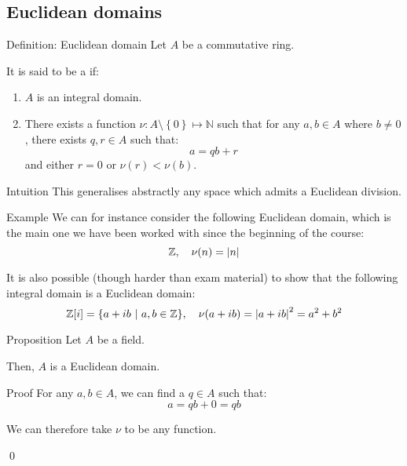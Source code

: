 \documentclass[a4paper]{article}
\begin{document}
\subsection{Euclidean domains}

\begin{parag}{Definition: Euclidean domain}
    Let $A$ be a commutative ring. 

    It is said to be a  if:
    \begin{enumerate}
        \item $A$ is an integral domain.
        \item There exists a function $\nu: A \setminus \left\{0\right\} \mapsto \mathbb{N}$ such that for any $a, b \in A$ where $b \neq 0$, there exists $q, r \in A$ such that: 
        \[a = qb + r\]
        and either $r = 0$ or $\nu\left(r\right) < \nu\left(b\right)$.
    \end{enumerate}

    \begin{subparag}{Intuition}
        This generalises abstractly any space which admits a Euclidean division.
    \end{subparag}

    \begin{subparag}{Example}
        We can for instance consider the following Euclidean domain, which is the main one we have been worked with since the beginning of the course:
        \[\mathbb{Z}, \mathspace \nu\left(n\right) = \left|n\right|\]

        It is also possible (though harder than exam material) to show that the following integral domain is a Euclidean domain: 
        \[\mathbb{Z}\left[i\right] = \left\{a + ib \suchthat a, b \in \mathbb{Z}\right\}, \mathspace \nu\left(a + ib\right) = \left|a + ib\right|^2 = a^2 + b^2\]
        
    \end{subparag}
\end{parag}

\begin{parag}{Proposition}
    Let $A$ be a field.

    Then, $A$ is a Euclidean domain.

    \begin{subparag}{Proof}
        For any $a, b \in A$, we can find a $q \in A$ such that: 
        \[a = qb + 0 = qb\]
        
        We can therefore take $\nu$ to be any function.

        \qed
    \end{subparag}
\end{parag}
\end{document}
